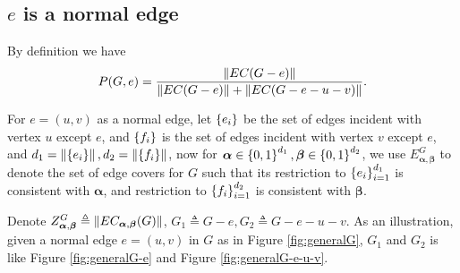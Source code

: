 \subsection{$e$ is a normal edge}
By definition we have
\begin{equation}
	P(G,e) = \frac{\left\Vert EC(G-e)\right\Vert}{\left\Vert EC(G-e)\right\Vert + \left\Vert EC(G-e-u-v)\right\Vert }.
\end{equation}


	For $e=(u,v)$ as a normal edge, let $\left\{e_i\right\}$ be the set of edges incident with vertex $u$ except $e$, and $\left\{f_i\right\}$ is the set of edges incident with vertex $v$ except $e$, and $d_1 = \left\Vert\left\{e_i\right\}\right\Vert, d_2 = \left\Vert\left\{f_i\right\}\right\Vert$, now for $\boldsymbol\alpha \in \left\{0,1\right\}^{d_1}, \boldsymbol\beta \in \left\{0,1\right\}^{d_2}$, we use $E_{\boldsymbol\alpha,\boldsymbol\beta}^G$ to denote the set of edge covers for $G$ such that its restriction to $\left\{e_i\right\}_{i=1}^{d_1}$ is consistent with $\boldsymbol\alpha$, and restriction to $\left\{f_i\right\}_{i=1}^{d_2}$ is consistent with $\boldsymbol\beta$.

	Denote $Z_{\boldsymbol\alpha, \boldsymbol\beta}^G \triangleq \left\Vert EC_{\boldsymbol\alpha, \boldsymbol\beta}(G)\right\Vert$, $G_1 \triangleq G-e, G_2 \triangleq G-e-u-v$. As an illustration, given a normal edge $e=(u,v)$ in $G$ as in Figure \ref{fig:generalG}, $G_1$ and $G_2$ is like Figure \ref{fig:generalG-e} and Figure \ref{fig:generalG-e-u-v}.

